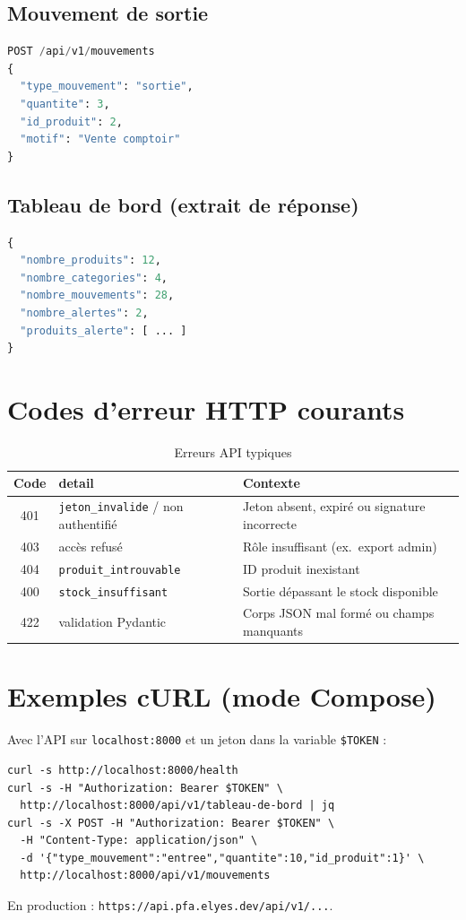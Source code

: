 \subsection{Mouvement de sortie}

\begin{lstlisting}[language=Python]
POST /api/v1/mouvements
{
  "type_mouvement": "sortie",
  "quantite": 3,
  "id_produit": 2,
  "motif": "Vente comptoir"
}
\end{lstlisting}

\subsection{Tableau de bord (extrait de réponse)}

\begin{lstlisting}[language=Python]
{
  "nombre_produits": 12,
  "nombre_categories": 4,
  "nombre_mouvements": 28,
  "nombre_alertes": 2,
  "produits_alerte": [ ... ]
}
\end{lstlisting}

\section{Codes d'erreur HTTP courants}

\begin{table}[htbp]
  \centering
  \caption{Erreurs API typiques}
  \label{tab:api-errors}
  \small
  \begin{tabular}{@{}clp{7cm}@{}}
    \toprule
    \textbf{Code} & \textbf{detail} & \textbf{Contexte} \\
    \midrule
    401 & \texttt{jeton\_invalide} / non authentifié & Jeton absent, expiré ou signature incorrecte \\
    403 & accès refusé & Rôle insuffisant (ex.\ export admin) \\
    404 & \texttt{produit\_introuvable} & ID produit inexistant \\
    400 & \texttt{stock\_insuffisant} & Sortie dépassant le stock disponible \\
    422 & validation Pydantic & Corps JSON mal formé ou champs manquants \\
    \bottomrule
  \end{tabular}
\end{table}

\section{Exemples cURL (mode Compose)}

Avec l'API sur \texttt{localhost:8000} et un jeton dans la variable \texttt{\$TOKEN} :

\begin{lstlisting}[style=bash]
curl -s http://localhost:8000/health
curl -s -H "Authorization: Bearer $TOKEN" \
  http://localhost:8000/api/v1/tableau-de-bord | jq
curl -s -X POST -H "Authorization: Bearer $TOKEN" \
  -H "Content-Type: application/json" \
  -d '{"type_mouvement":"entree","quantite":10,"id_produit":1}' \
  http://localhost:8000/api/v1/mouvements
\end{lstlisting}

En production : \texttt{https://api.pfa.elyes.dev/api/v1/...}.
